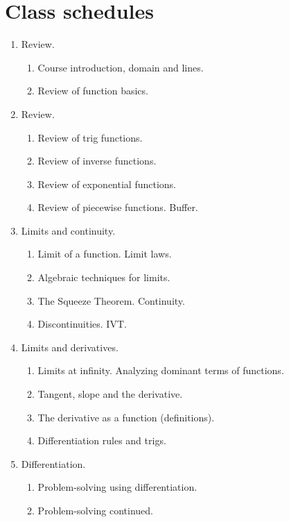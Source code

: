 \documentclass[../main.tex]{subfiles}
\begin{document}
\section{Class schedules}

\begin{multicols}{2}
  \begin{enumerate}[wide, label={\textbf{Week \arabic*}.}]
    \item Review.
      \begin{enumerate}
        \item Course introduction, domain and lines.
        \item Review of function basics.
      \end{enumerate}

    \item Review.
      \begin{enumerate}[resume]
        \item Review of trig functions.
        \item Review of inverse functions.
        \item Review of exponential functions.
        \item Review of piecewise functions. Buffer.
      \end{enumerate}

    \item Limits and continuity.
      \begin{enumerate}[resume]
        \item Limit of a function. Limit laws.
        \item Algebraic techniques for limits. 
        \item The Squeeze Theorem. Continuity.
        \item Discontinuities. IVT. 
      \end{enumerate}

    \item Limits and derivatives.
      \begin{enumerate}[resume]
        \item Limits at infinity. Analyzing dominant terms of functions. 
        \item Tangent, slope and the derivative.
        \item The derivative as a function (definitions).
        \item Differentiation rules and trigs.
      \end{enumerate}

    \item Differentiation.
      \begin{enumerate}[resume]
        \item Problem-solving using differentiation. 
        \item Problem-solving continued.
      \end{enumerate}


\end{enumerate}
\end{multicols}
\end{document}
